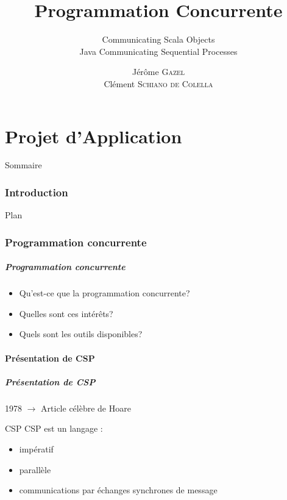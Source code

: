 \documentclass[slidetop,11pt]{beamer}
\title{Programmation Concurrente}
\subtitle{Communicating Scala Objects\\Java Communicating Sequential Processes}
\author{Jérôme \textsc{Gazel} \\ Clément \textsc{Schiano de Colella}}
\institute{\'Ecole Centrale de Nantes}
\date{\oldstylenums{vendredi 25 mars 2011}}
\begin{document}
\frame{\titlepage}
%
\part{Projet d'Application} 
\begin{frame}{Sommaire}
  \small \tableofcontents[hideallsubsections]
\end{frame} 


\section{Introduction}
\begin{frame}{Plan}
  \tableofcontents[sections=\thesection]
\end{frame}
\section{Programmation concurrente}
\begin{frame}[label=pagesimple]
  \frametitle{Programmation concurrente}
    \begin{itemize}[<+->]
  \item Qu'est-ce que la programmation concurrente?
  \item Quelles sont ces intérêts?
   \item Quels sont les outils disponibles?
    \end{itemize}
\end{frame}

\subsection{Présentation de CSP}
\begin{frame} 
  \frametitle{Présentation de CSP}
  1978 $\rightarrow$ Article célèbre de Hoare\\ 
  \pause
  \begin{block}{CSP}
  CSP est un langage :
\begin{itemize}[<+->]
\item impératif
\item parallèle
\item communications par échanges synchrones de message
 \end{itemize}
 \end{block}
\end{frame}
\end{document}
